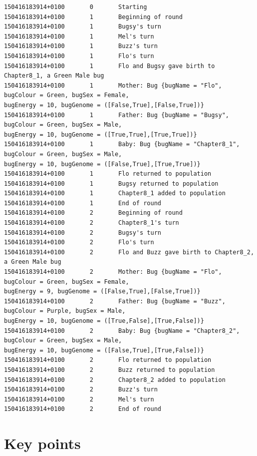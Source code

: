 \documentclass[a4paper,10pt]{report}
\begin{document}
\begin{verbatim}
150416183914+0100       0       Starting
150416183914+0100       1       Beginning of round
150416183914+0100       1       Bugsy's turn
150416183914+0100       1       Mel's turn
150416183914+0100       1       Buzz's turn
150416183914+0100       1       Flo's turn
150416183914+0100       1       Flo and Bugsy gave birth to Chapter8_1, a Green Male bug
150416183914+0100       1       Mother: Bug {bugName = "Flo", bugColour = Green, bugSex = Female,
bugEnergy = 10, bugGenome = ([False,True],[False,True])}
150416183914+0100       1       Father: Bug {bugName = "Bugsy", bugColour = Green, bugSex = Male,
bugEnergy = 10, bugGenome = ([True,True],[True,True])}
150416183914+0100       1       Baby: Bug {bugName = "Chapter8_1", bugColour = Green, bugSex = Male,
bugEnergy = 10, bugGenome = ([False,True],[True,True])}
150416183914+0100       1       Flo returned to population
150416183914+0100       1       Bugsy returned to population
150416183914+0100       1       Chapter8_1 added to population
150416183914+0100       1       End of round
150416183914+0100       2       Beginning of round
150416183914+0100       2       Chapter8_1's turn
150416183914+0100       2       Bugsy's turn
150416183914+0100       2       Flo's turn
150416183914+0100       2       Flo and Buzz gave birth to Chapter8_2, a Green Male bug
150416183914+0100       2       Mother: Bug {bugName = "Flo", bugColour = Green, bugSex = Female,
bugEnergy = 9, bugGenome = ([False,True],[False,True])}
150416183914+0100       2       Father: Bug {bugName = "Buzz", bugColour = Purple, bugSex = Male,
bugEnergy = 10, bugGenome = ([True,False],[True,False])}
150416183914+0100       2       Baby: Bug {bugName = "Chapter8_2", bugColour = Green, bugSex = Male,
bugEnergy = 10, bugGenome = ([False,True],[True,False])}
150416183914+0100       2       Flo returned to population
150416183914+0100       2       Buzz returned to population
150416183914+0100       2       Chapter8_2 added to population
150416183914+0100       2       Buzz's turn
150416183914+0100       2       Mel's turn
150416183914+0100       2       End of round
\end{verbatim}

\section{Key points}
\end{document}
